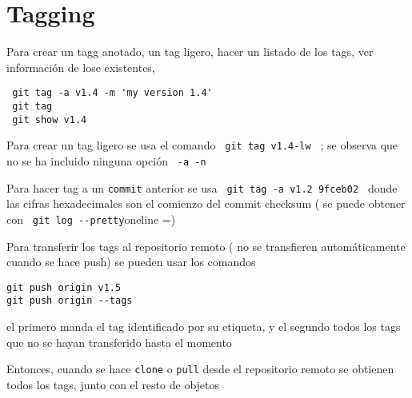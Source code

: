 \documentclass[]{article}
\begin{document}
\section{Tagging}

Para crear un tagg anotado, un tag ligero, hacer un listado de los tags, ver información de lose existentes, 
\begin{verbatim}
 git tag -a v1.4 -m 'my version 1.4'
 git tag
 git show v1.4
\end{verbatim}

Para crear un tag ligero se usa el comando \verb= git tag v1.4-lw = ; se observa que no se ha incluido ninguna opción \verb= -a -n =

Para hacer tag a un \texttt{commit} anterior se usa \verb= git tag -a v1.2 9fceb02 = donde las cifras hexadecimales son el comienzo del commit checksum ( se puede obtener con \verb= git log --pretty=oneline =)

Para transferir los tags al repositorio remoto ( no se transfieren automáticamente cuando se hace push) se pueden usar los comandos

\begin{verbatim}
git push origin v1.5
git push origin --tags
\end{verbatim}

el primero manda el tag identificado por su etiqueta, y el segundo todos los tags que no se hayan transferido hasta el momento

Entonces, cuando se hace \texttt{clone} o \texttt{pull} desde el repositorio remoto se obtienen todos los tags, junto con el resto de objetos
\end{document}
